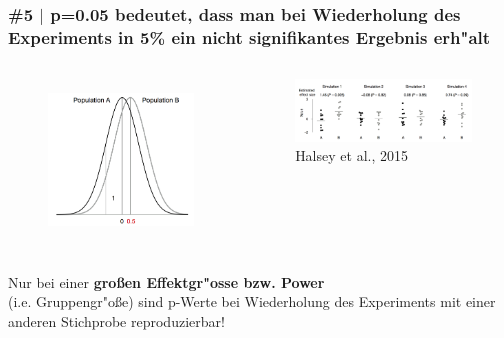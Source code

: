 \documentclass{beamer}
\begin{document}
\begin{frame}
	\frametitle{\#5 $\mid$ p=0.05 bedeutet, dass man bei Wiederholung des Experiments in 5\% ein nicht signifikantes Ergebnis erh"alt }
	
\begin{columns}
		

\begin{figure}
\centering
\includegraphics[width=1.2\linewidth]{simulated_populations}
\label{fig:simulated_populations}
\end{figure}

	
\begin{figure}
\centering
\includegraphics[width=1\linewidth]{simulations}
\caption{{\footnotesize Halsey et al., 2015}}
\label{fig:simulations}
\end{figure}
\end{columns}
\vspace{2em}
Nur bei	einer \textbf{gro\ss{}en Effektgr"osse bzw. Power} \\
(i.e. Gruppengr"o\ss{}e) sind p-Werte bei Wiederholung des Experiments mit einer anderen Stichprobe reproduzierbar!
\end{frame}
\end{document}
